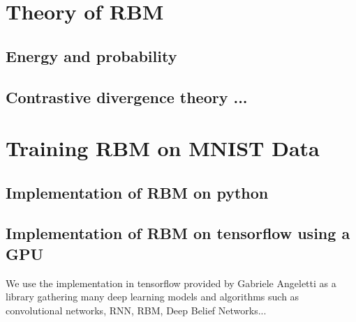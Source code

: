 \documentclass[a4paper,10pt]{article}
\begin{document}

\section{Theory of RBM}

\subsection{Energy and probability}

\subsection{Contrastive divergence theory ...}



\section{Training RBM on MNIST Data}

\subsection{Implementation of RBM on python}

\subsection{Implementation of RBM on tensorflow using a GPU}

We use the implementation in tensorflow provided by Gabriele Angeletti as a library gathering many deep learning models and algorithms such as convolutional networks, RNN, RBM, Deep Belief Networks...






\end{document}
